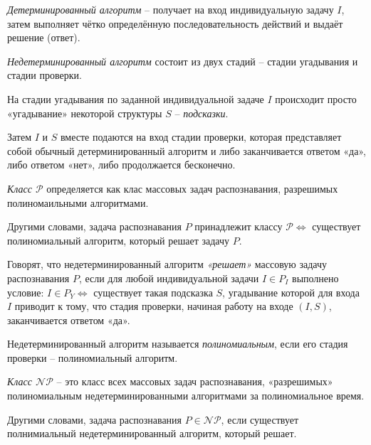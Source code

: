 \begin{definition}
    \emph{Детерминированный алгоритм} -- получает на вход индивидуальную задачу $I$, затем выполняет чётко определённую последовательность действий и выдаёт решение (ответ).
\end{definition}

\begin{definition}
    \emph{Недетерминированный алгоритм} состоит из двух стадий -- стадии угадывания и стадии проверки.

    На стадии угадывания по заданной индивидуальной задаче $I$ происходит просто «угадывание» некоторой структуры $S$ -- \emph{подсказки}.

    Затем $I$ и $S$ вместе подаются на вход стадии проверки, которая представляет собой обычный детерминированный алгоритм и либо заканчивается ответом «да», либо ответом «нет», либо продолжается бесконечно.
\end{definition}

\begin{definition}
    \emph{Класс $ \mathcal{P} $} определяется как клас массовых задач распознавания, разрешимых полиномаильными алгоритмами.

    Другими словами, задача распознавания $ P $ принадлежит классу $ \mathcal{P} \iff $ существует полиномиальный алгоритм, который решает задачу $ P $.
\end{definition}

\begin{definition}
    Говорят, что недетерминированный алгоритм \emph{«решает»} массовую задачу распознавания $P$, если для любой индивидуальной задачи $I \in P_I$ выполнено условие: $I \in P_Y \iff $ существует такая подсказка $S$, угадывание которой для входа $I$ приводит к тому, что стадия проверки, начиная работу на входе $(I, S)$, заканчивается ответом «да».
\end{definition}

\begin{definition}
    Недетерминированный алгоритм называется \emph{полиномиальным}, если его стадия проверки -- полиномиальный алгоритм.
\end{definition}

\begin{definition}
    \emph{Класс $ \mathcal{NP} $} -- это класс всех массовых задач распознавания, «разрешимых» полиномиальным недетерминированными алгоритмами за полиномиальное время.

    Другими словами, задача распознавания $ P \in \mathcal{NP} $, если существует полнимиальный недетерминированный алгоритм, который решает.
\end{definition}

